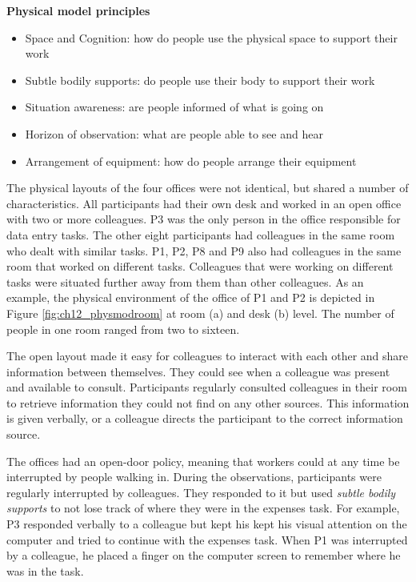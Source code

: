 \begin{framed}\noindent
\textbf{Physical model principles}

\begin{itemize}
\item Space and Cognition: how do people use the physical space to support their work
\item Subtle bodily supports: do people use their body to support their work
\item Situation awareness: are people informed of what is going on
\item Horizon of observation: what are people able to see and hear
\item Arrangement of equipment: how do people arrange their equipment
\end{itemize}

\end{framed}

The physical layouts of the four offices were not identical, but shared a number of characteristics. All participants had their own desk and worked in an open office with two or more colleagues. P3 was the only person in the office responsible for data entry tasks. The other eight participants had colleagues in the same room who dealt with similar tasks. P1, P2, P8 and P9 also had colleagues in the same room that worked on different tasks. Colleagues that were working on different tasks were situated further away from them than other colleagues. As an example, the physical environment of the office of P1 and P2 is depicted in Figure \ref{fig:ch12_physmodroom} at room (a) and desk (b) level. The number of people in one room ranged from two to sixteen. 

The open layout made it easy for colleagues to interact with each other and share information between themselves. They could see when a colleague was present and available to consult. Participants regularly consulted colleagues in their room to retrieve information they could not find on any other sources. This information is given verbally, or a colleague directs the participant to the correct information source.

The offices had an open-door policy, meaning that workers could at any time be interrupted by people walking in. During the observations, participants were regularly interrupted by colleagues. They responded to it but used \textit{subtle bodily supports} to not lose track of where they were in the expenses task. For example, P3 responded verbally to a colleague but kept his kept his visual attention on the computer and tried to continue with the expenses task. When P1 was interrupted by a colleague, he placed a finger on the computer screen to remember where he was in the task.

